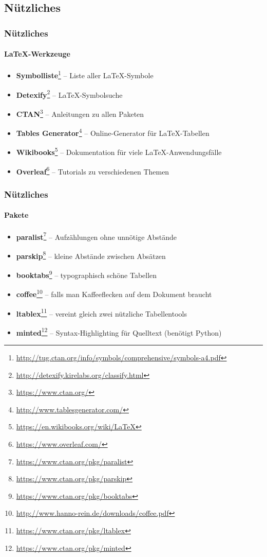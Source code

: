 

\subsection*{Nützliches}

\begin{frame}
\frametitle{Nützliches}
\framesubtitle{LaTeX-Werkzeuge}
\begin{itemize}
  \item \textbf{Symbolliste}\footnote{\url{http://tug.ctan.org/info/symbols/comprehensive/symbols-a4.pdf}} -- Liste aller \LaTeX -Symbole \\
  \item \textbf{Detexify}\footnote{\url{http://detexify.kirelabs.org/classify.html}} -- \LaTeX -Symbolsuche\\
  \item \textbf{CTAN}\footnote{\url{https://www.ctan.org/}} -- Anleitungen zu allen Paketen
  \item \textbf{Tables Generator}\footnote{\url{http://www.tablesgenerator.com/}} -- Online-Generator für \LaTeX -Tabellen  \\
  \item \textbf{Wikibooks}\footnote{\url{https://en.wikibooks.org/wiki/LaTeX}} -- Dokumentation für viele \LaTeX -Anwendungsfälle \\
  \item \textbf{Overleaf}\footnote{\url{https://www.overleaf.com/}} -- Tutorials zu verschiedenen Themen \\
\end{itemize}
\end{frame}


\begin{frame}
\frametitle{Nützliches}
\framesubtitle{Pakete}
\begin{itemize}
  \item \textbf{paralist}\footnote{\url{https://www.ctan.org/pkg/paralist}} -- Aufzählungen ohne unnötige Abstände \\
  \item \textbf{parskip}\footnote{\url{https://www.ctan.org/pkg/parskip}} -- kleine Abstände zwischen Absätzen \\
  \item \textbf{booktabs}\footnote{\url{https://www.ctan.org/pkg/booktabs}} -- typographisch schöne Tabellen \\
  \item \textbf{coffee}\footnote{\url{http://www.hanno-rein.de/downloads/coffee.pdf}} -- falls man Kaffeeflecken auf dem Dokument braucht \\
  \item \textbf{ltablex}\footnote{\url{https://www.ctan.org/pkg/ltablex}} -- vereint gleich zwei nützliche Tabellentools \\
  \item \textbf{minted}\footnote{\url{https://www.ctan.org/pkg/minted}} -- Syntax-Highlighting für Quelltext (benötigt Python) \\
\end{itemize}
\end{frame}

